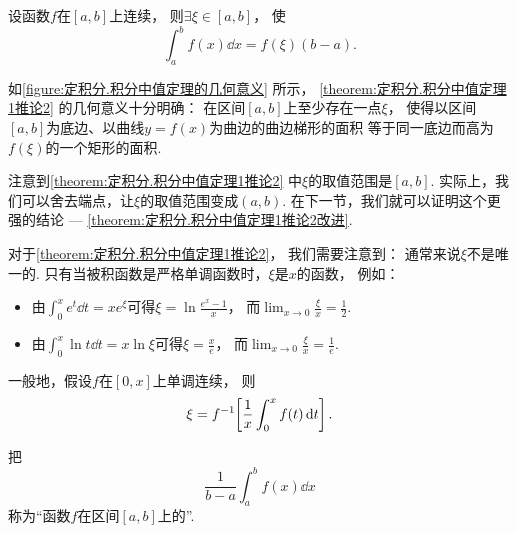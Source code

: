 \begin{corollary}\label{theorem:定积分.积分中值定理1推论2}
设函数\(f\)在\([a,b]\)上连续，
则\(\exists\xi\in[a,b]\)，
使\begin{equation}
	\int_a^b f(x) \dd{x} = f(\xi) (b-a).
\end{equation}
\end{corollary}
\begin{remark}
如\cref{figure:定积分.积分中值定理的几何意义} 所示，
\cref{theorem:定积分.积分中值定理1推论2} 的几何意义十分明确：
在区间\([a,b]\)上至少存在一点\(\xi\)，
使得以区间\([a,b]\)为底边、以曲线\(y=f(x)\)为曲边的曲边梯形的面积
等于同一底边而高为\(f(\xi)\)的一个矩形的面积.
\end{remark}
\begin{remark}
注意到\cref{theorem:定积分.积分中值定理1推论2} 中\(\xi\)的取值范围是\([a,b]\).
实际上，我们可以舍去端点，让\(\xi\)的取值范围变成\((a,b)\).
在下一节，我们就可以证明这个更强的结论 --- \cref{theorem:定积分.积分中值定理1推论2改进}.
\end{remark}
\begin{remark}
对于\cref{theorem:定积分.积分中值定理1推论2}，
我们需要注意到：
通常来说\(\xi\)不是唯一的.
只有当被积函数是严格单调函数时，\(\xi\)是\(x\)的函数，
例如：\begin{itemize}
	\item 由\(\int_0^x e^t \dd{t} = x e^\xi\)可得\(\xi = \ln\frac{e^x-1}{x}\)，
	而\(\lim_{x\to0} \frac{\xi}{x} = \frac12\).
	\item 由\(\int_0^x \ln t \dd{t} = x \ln\xi\)可得\(\xi = \frac{x}{e}\)，
	而\(\lim_{x\to0} \frac{\xi}{x} = \frac1e\).
\end{itemize}

一般地，假设\(f\)在\([0,x]\)上单调连续，
则\[
	\xi = f^{-1}\kern-2pt\left[ \frac1x \int_0^x f(t) \dd{t} \right].
\]
\end{remark}
\begin{definition}
把\begin{equation}
	\frac{1}{b-a} \int_a^b f(x) \dd{x}
\end{equation}
称为“函数\(f\)在区间\([a,b]\)上的”.
\end{definition}

